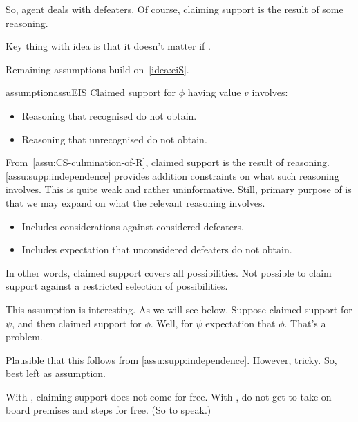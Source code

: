 \begin{note}
  {
    \color{blue} So, agent deals with defeaters.
    Of course, claiming support is the result of some reasoning.

    Key thing with idea is that it doesn't matter if \mom{}.

    Remaining assumptions build on~\autoref{idea:eiS}.
  }

  \begin{restatable}[\eiS{-} --- \eiS{}]{assumption}{assuEIS}\label{assu:supp:independence}
    Claimed support for \(\phi\) having value \(v\) involves:
    \begin{itemize}
    \item Reasoning that recognised  do not obtain.
    \item Reasoning that unrecognised  do not obtain.
    \end{itemize}
    \vspace{-\baselineskip}
  \end{restatable}

  From~\autoref{assu:CS-culmination-of-R}, claimed support is the result of reasoning.
  \autoref{assu:supp:independence} provides addition constraints on what such reasoning involves.
  This is quite weak and rather uninformative.
  Still, primary purpose of \eiS{} is that we may expand on what the relevant reasoning involves.

  \begin{itemize}
  \item Includes considerations against considered defeaters.
  \item Includes expectation that unconsidered defeaters do not obtain.
  \end{itemize}

  {\color{blue}
    In other words, claimed support covers all possibilities.
    Not possible to claim support against a restricted selection of possibilities.

    This assumption is interesting.
    As we will see below.
    Suppose claimed support for \(\psi\), and then claimed support for \(\phi\).
    Well, for \(\psi\) expectation that \(\phi\).
    That's a problem.

    Plausible that this follows from \ref{assu:supp:independence}.
    However, tricky.
    So, best left as assumption.
  }

  {\color{red}
    With \misled{}, claiming support does not come for free.
    With \mistaken{}, do not get to take on board premises and steps for free.
    (So to speak.)
  }


\end{note}
